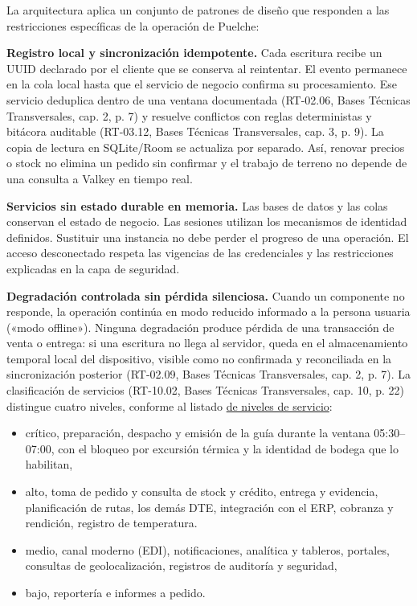 La arquitectura aplica un conjunto de patrones de diseño que responden a las restricciones específicas de la operación de Puelche:

\textbf{Registro local y sincronización idempotente.} Cada escritura recibe un UUID declarado por el cliente que se conserva al reintentar. El evento permanece en la cola local hasta que el servicio de negocio confirma su procesamiento. Ese servicio deduplica dentro de una ventana documentada (RT-02.06, Bases Técnicas Transversales, cap. 2, p. 7) y resuelve conflictos con reglas deterministas y bitácora auditable (RT-03.12, Bases Técnicas Transversales, cap. 3, p. 9). La copia de lectura en SQLite/Room se actualiza por separado. Así, renovar precios o stock no elimina un pedido sin confirmar y el trabajo de terreno no depende de una consulta a Valkey en tiempo real.

\textbf{Servicios sin estado durable en memoria.} Las bases de datos y las colas conservan el estado de negocio. Las sesiones utilizan los mecanismos de identidad definidos. Sustituir una instancia no debe perder el progreso de una operación. El acceso desconectado respeta las vigencias de las credenciales y las restricciones explicadas en la capa de seguridad.

\textbf{Degradación controlada sin pérdida silenciosa.} Cuando un componente no responde, la operación continúa en modo reducido informado a la persona usuaria («modo offline»). Ninguna degradación produce pérdida de una transacción de venta o entrega: si una escritura no llega al servidor, queda en el almacenamiento temporal local del dispositivo, visible como no confirmada y reconciliada en la sincronización posterior (RT-02.09, Bases Técnicas Transversales, cap. 2, p. 7). La clasificación de servicios (RT-10.02, Bases Técnicas Transversales, cap. 10, p. 22) distingue cuatro niveles, conforme al listado \hyperref[tab:jd05]{de niveles de servicio}:

\begin{itemize}
  \item crítico, preparación, despacho y emisión de la guía durante la ventana 05:30--07:00, con el bloqueo por excursión térmica y la identidad de bodega que lo habilitan,
  \item alto, toma de pedido y consulta de stock y crédito, entrega y evidencia, planificación de rutas, los demás DTE, integración con el ERP, cobranza y rendición, registro de temperatura.
  \item medio, canal moderno (EDI), notificaciones, analítica y tableros, portales, consultas de geolocalización, registros de auditoría y seguridad,
  \item bajo, reportería e informes a pedido.
\end{itemize}

